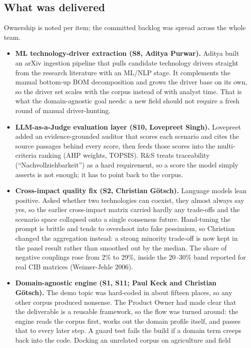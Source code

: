 \documentclass[11pt,a4paper]{article}
\begin{document}
\subsection*{What was delivered}
Ownership is noted per item; the committed backlog was spread across the whole team.
\begin{itemize}
  \item \textbf{ML technology-driver extraction (S8, Aditya Purwar).} Aditya built an arXiv ingestion
  pipeline that pulls candidate technology drivers straight from the research literature with an ML/NLP
  stage. It complements the manual bottom-up BOM decomposition and grows the driver base on its own, so the
  driver set scales with the corpus instead of with analyst time. That is what the domain-agnostic goal
  needs: a new field should not require a fresh round of manual driver-hunting.
  \item \textbf{LLM-as-a-Judge evaluation layer (S10, Lovepreet Singh).} Lovepreet added an evidence-grounded
  auditor that scores each scenario and cites the source passages behind every score, then feeds those
  scores into the multi-criteria ranking (AHP weights, TOPSIS). R\&S treats traceability
  (\enquote{Nachvollziehbarkeit}) as a hard requirement, so a score the model simply asserts is not enough;
  it has to point back to the corpus.
  \item \textbf{Cross-impact quality fix (S2, Christian Götsch).} Language models lean positive. Asked
  whether two technologies can coexist, they almost always say yes, so the earlier cross-impact matrix
  carried hardly any trade-offs and the scenario space collapsed onto a single consensus future. Hand-tuning
  the prompt is brittle and tends to overshoot into fake pessimism, so Christian changed the aggregation
  instead: a strong minority trade-off is now kept in the panel result rather than smoothed out by the
  median. The share of negative couplings rose from 2\% to 29\%, inside the 20--30\% band reported for real
  CIB matrices (Weimer-Jehle 2006).
  \item \textbf{Domain-agnostic engine (S1, S11; Paul Keck and Christian Götsch).} The demo topic was
  hard-coded in about fifteen places, so any other corpus produced nonsense. The Product Owner had made
  clear that the deliverable is a reusable framework, so the flow was turned around: the engine reads the
  corpus first, works out the domain profile itself, and passes that to every later step. A guard test fails
  the build if a domain term creeps back into the code. Docking an unrelated corpus on agriculture and field

\end{itemize}
\end{document}
